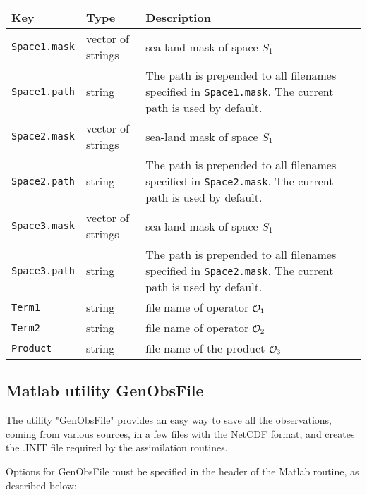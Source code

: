 \documentclass[a4paper,12pt]{article}
\newcommand{\code}{\texttt}
\newenvironment{keytabular}{\begin{tabular}{|p{0.3\textwidth}|p{0.2\textwidth}|p{0.5\textwidth}|} \hline Key & Type & Description \\ \hline \hline }{\end{tabular}}
\begin{document}
\begin{keytabular}
\code{Space1.mask} & vector of strings &  sea-land mask of space $S_1$ 
\\
\code{Space1.path} & string & The path is prepended to all filenames
specified in \code{Space1.mask}. The current path is used by default.
\\
\code{Space2.mask} & vector of strings &  sea-land mask of space $S_1$ 
\\
\code{Space2.path} & string & The path is prepended to all filenames
specified in \code{Space2.mask}. The current path is used by default.
\\
\code{Space3.mask} & vector of strings &  sea-land mask of space $S_1$ 
\\
\code{Space3.path} & string & The path is prepended to all filenames
specified in \code{Space2.mask}. The current path is used by default.
\\
\code{Term1} & string & file name of operator ${\cal O}_1$
\\
\code{Term2} & string & file name of operator ${\cal O}_2$
\\
\code{Product} & string & file name of the product ${\cal O}_3$
\\
\hline
\end{keytabular}

\subsection{Matlab utility GenObsFile}

The utility "GenObsFile" provides an easy way to save all the observations, coming from various sources, in a few files with the NetCDF format, and creates the .INIT file required by the assimilation routines.

Options for GenObsFile must be specified in the header of the Matlab routine, as described below:
\end{document}

